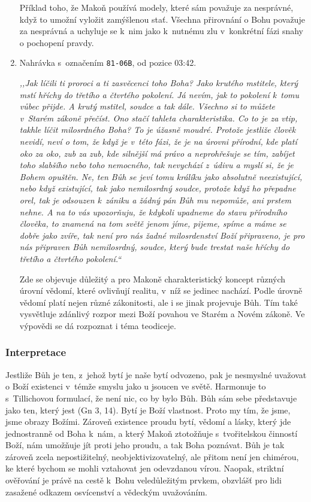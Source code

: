 \begin{enumerate}
{Příklad toho, že Makoň používá modely, které sám považuje za nesprávné, když to
umožní vyložit zamýšlenou stať. Všechna přirovnání o Bohu považuje za nesprávná
a uchyluje se k~nim jako k~nutnému zlu v~konkrétní fázi snahy o pochopení
pravdy.

}

\item{%
Nahrávka s~označením \texttt{81-06B}, od pozice 03:42.

\textit{%
,,Jak líčili ti proroci a ti zasvěcenci toho Boha? Jako krutého mstitele, který
mstí hříchy do třetího a čtvrtého pokolení. Já nevím, jak to pokolení k~tomu
vůbec přijde. A krutý mstitel,
soudce a tak dále. Všechno si to můžete v~Starém zákoně přečíst. Ono stačí tahleta
charakteristika. Co to je za vtip, takhle líčit milosrdného Boha? To je úžasně
moudré.
Protože jestliže člověk nevidí, neví o tom, že když je v~této fázi, že je na úrovni
přírodní, kde platí oko za oko, zub za zub, kde silnější má právo a neprohřešuje
se tím, zabíjet toho slabšího nebo toho nemocného, tak nevychází z~údivu a
myslí si,
že je Bohem opuštěn. Ne, ten Bůh se jeví tomu králíku jako absolutně
neexistující,
nebo když existující, tak jako nemilosrdný soudce, protože když ho přepadne orel,
tak je odsouzen k~zániku a žádný pán Bůh mu nepomůže, ani prstem nehne. A na to
vás upozorňuju, že kdykoli upadneme do stavu přírodního člověka, to znamená na
tom světě jenom jíme, pijeme, spíme a máme se dobře jako zvíře, tak není pro nás
žadné milosrdenství Boží připraveno, je pro nás připraven Bůh nemilosrdný,
soudce, který bude trestat naše hříchy do třetího a čtvrtého pokolení.``
}

Zde se objevuje důležitý a pro Makoně charakteristický koncept různých úrovní
vědomí, které ovlivňují realitu, v~níž se jedinec nachází. Podle úrovně vědomí
platí nejen různé zákonitosti, ale i se jinak projevuje Bůh. Tím také vysvětluje
zdánlivý rozpor mezi Boží povahou ve Starém a Novém zákoně. Ve výpovědi se dá
rozpoznat i téma teodiceje.

}

\end{enumerate}

\subsubsection*{Interpretace}

Jestliže Bůh je ten, z~jehož bytí je naše bytí odvozeno, pak je nesmyslné
uvažovat o Boží existenci v~témže smyslu jako u jsoucen ve světě. Harmonuje to
s~Tillichovou formulací, že není nic, co by bylo Bůh\cite{tillich1975systematic}.
Bůh sám sebe představuje jako ten, který jest (Gn 3, 14). Bytí je Boží vlastnost. Proto my
tím, že jsme, jsme obrazy Božími. Zároveň existence proudu bytí, vědomí a lásky,
který jde jednostranně od Boha k~nám, a který Makoň ztotožňuje s~tvořitelskou
činností Boží, nám umožňuje jít proti jeho proudu, a tak Boha poznávat. Bůh je
tak zároveň zcela nepostižitelný, neobjektivizovatelný, ale přitom není jen
chimérou, ke které bychom se mohli vztahovat jen odevzdanou vírou. Naopak,
striktní ověřování je právě na cestě k~Bohu veledůležitým prvkem, obzvlášť pro
lidi zasažené odkazem osvícenství a vědeckým uvažováním.

